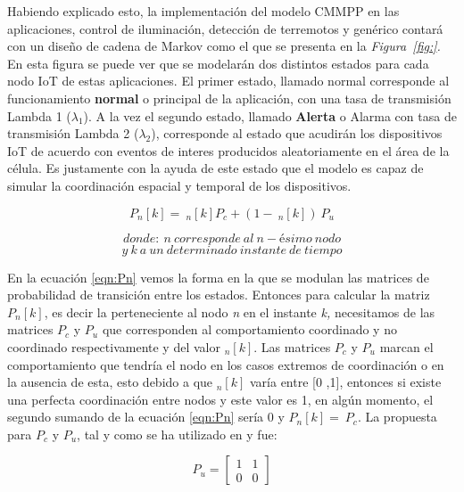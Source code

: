Habiendo explicado esto, la implementación del modelo CMMPP en las aplicaciones, control de iluminación, detección de terremotos y genérico contará con un diseño de cadena de Markov como el que se presenta en la \textit{Figura~\ref{fig:}. }En esta figura se puede ver que se modelarán dos distintos estados para cada nodo IoT de estas aplicaciones. El primer estado, llamado normal corresponde al funcionamiento \textbf{normal} o principal de la aplicación, con una tasa de transmisión Lambda 1 (${\lambda }_1$). A la vez el segundo estado, llamado \textbf{Alerta} o Alarma con tasa de transmisión Lambda 2 (${\lambda }_2$), corresponde al estado que acudirán los dispositivos IoT de acuerdo con eventos de interes producidos aleatoriamente en el área de la célula. Es justamente con la ayuda de este estado que el modelo es capaz de simular la coordinación espacial y temporal de los dispositivos.

\begin{equation}
P_n\left[k\right]=\ _n\left[k\right] P_c+\left(1-\ _n\left[k\right]\right)\ P_u 
\label{eqn:Pn}
\end{equation}

\[donde:\ n\ corresponde\ al\ n-\textrm{é}simo\ nodo\] 
\[y\ k\ a\ un\ determinado\ instante\ de\ tiempo\] 

En la ecuación \ref{eqn:Pn} vemos la forma en la que se modulan las matrices de probabilidad de transición entre los estados. Entonces para calcular la matriz $P_n\left[k\right]$, es decir la perteneciente al nodo \textit{n }en el instante \textit{k, }necesitamos de las matrices $P_c$ y $P_u$ que corresponden al comportamiento coordinado y no coordinado respectivamente y del valor $_n\left[k\right]$. Las matrices $P_c$ y $P_u$ marcan el comportamiento que tendría el nodo en los casos extremos de coordinación o en la ausencia de esta, esto debido a que $_n\left[k\right]$ varía entre [0 ,1], entonces si existe una perfecta coordinación entre nodos y este valor es 1, en algún momento, el segundo sumando de la ecuación \ref{eqn:Pn} sería 0 y $P_n\left[k\right]=\ P_c$. La propuesta para $P_c$ y $P_u$, tal y como se ha utilizado en \parencite{Gupta2018} y \parencite{Smiljkovic2014} fue:

\begin{equation}
P_{u} =  
\begin{bmatrix}
1 & 1 \\
0 & 0 
\end{bmatrix}
\end{equation}

